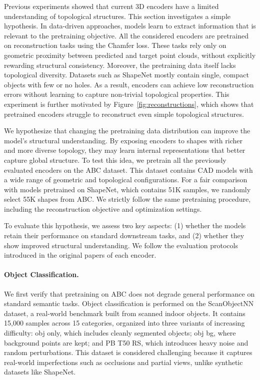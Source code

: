 Previous experiments showed that current 3D encoders have a limited understanding of topological structures. This section investigates a simple hypothesis. In data-driven approaches, models learn to extract information that is relevant to the pretraining objective. All the considered encoders are pretrained on reconstruction tasks using the Chamfer loss. These tasks rely only on geometric proximity between predicted and target point clouds, without explicitly rewarding structural consistency. Moreover, the pretraining data itself lacks topological diversity. Datasets such as ShapeNet mostly contain single, compact objects with few or no holes. As a result, encoders can achieve low reconstruction errors without learning to capture non-trivial topological properties. This experiment is further motivated by Figure~\ref{fig:reconstructions}, which shows that pretrained encoders struggle to reconstruct even simple topological structures.


We hypothesize that changing the pretraining data distribution can improve the model's structural understanding. By exposing encoders to shapes with richer and more diverse topology, they may learn internal representations that better capture global structure. To test this idea, we pretrain all the previously evaluated encoders on the ABC dataset. This dataset contains CAD models with a wide range of geometric and topological configurations. For a fair comparison with models pretrained on ShapeNet, which contains 51K samples, we randomly select 55K shapes from ABC. We strictly follow the same pretraining procedure, including the reconstruction objective and optimization settings.

To evaluate this hypothesis, we assess two key aspects: (1) whether the models retain their performance on standard downstream tasks, and (2) whether they show improved structural understanding. We follow the evaluation protocols introduced in the original papers of each encoder.

\paragraph{Object Classification.}
We first verify that pretraining on ABC does not degrade general performance on standard semantic tasks. Object classification is performed on the ScanObjectNN dataset, a real-world benchmark built from scanned indoor objects. It contains 15,000 samples across 15 categories, organized into three variants of increasing difficulty: obj only, which includes cleanly segmented objects; obj bg, where background points are kept; and PB T50 RS, which introduces heavy noise and random perturbations. This dataset is considered challenging because it captures real-world imperfections such as occlusions and partial views, unlike synthetic datasets like ShapeNet.

